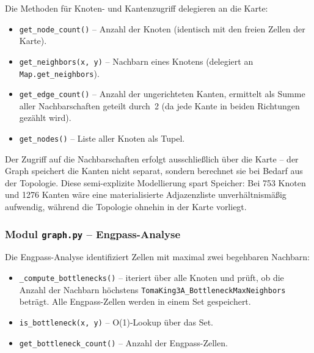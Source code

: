 Die Methoden für Knoten- und Kantenzugriff delegieren an die Karte:



\begin{itemize}
    \item \texttt{get\_node\_count()} -- Anzahl der Knoten (identisch mit den freien Zellen der Karte).
    \item \texttt{get\_neighbors(x, y)} -- Nachbarn eines Knotens (delegiert an \texttt{Map.get\_neighbors}).
    \item \texttt{get\_edge\_count()} -- Anzahl der ungerichteten Kanten, ermittelt als Summe aller Nachbarschaften geteilt durch~2 (da jede Kante in beiden Richtungen gezählt wird).
    \item \texttt{get\_nodes()} -- Liste aller Knoten als Tupel.
\end{itemize}

Der Zugriff auf die Nachbarschaften erfolgt ausschließlich über die Karte -- der Graph speichert die Kanten nicht separat, sondern berechnet sie bei Bedarf aus der Topologie. Diese semi-explizite Modellierung spart Speicher: Bei 753 Knoten und 1276 Kanten wäre eine materialisierte Adjazenzliste unverhältnismäßig aufwendig, während die Topologie ohnehin in der Karte vorliegt.


\subsubsection{Modul \texttt{graph.py} – Engpass-Analyse}

Die Engpass-Analyse identifiziert Zellen mit maximal zwei begehbaren Nachbarn:



\begin{itemize}
    \item \texttt{\_compute\_bottlenecks()} -- iteriert über alle Knoten und prüft, ob die Anzahl der Nachbarn höchstens \texttt{TomaKing3A\_BottleneckMaxNeighbors} beträgt. Alle Engpass-Zellen werden in einem Set gespeichert.
    \item \texttt{is\_bottleneck(x, y)} -- O(1)-Lookup über das Set.
    \item \texttt{get\_bottleneck\_count()} -- Anzahl der Engpass-Zellen.
\end{itemize}


